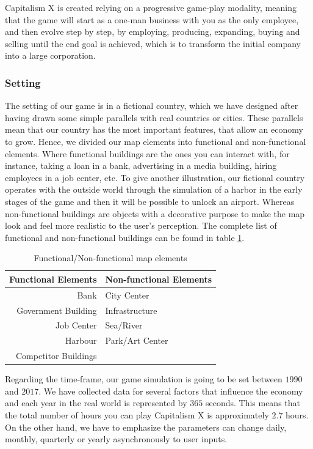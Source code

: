\documentclass[11pt,titlepage,oneside,openany]{book}
\begin{document}
Capitalism X is created relying on a progressive game-play modality, meaning that the game will start as a one-man business with you as the only employee, and then evolve step by step, by employing, producing, expanding, buying and selling until the end goal is achieved, which is to transform the initial company into a large corporation. 

\subsubsection{Setting}
The setting of our game is in a fictional country, which we have designed after having drawn some simple parallels with real countries or cities. These parallels mean that our country has the most important features, that allow an economy to grow. Hence, we divided our map elements into functional and non-functional elements. Where functional buildings are the ones you can interact with, for instance, taking a loan in a bank, advertising in a media building, hiring employees in a job center, etc.  To give another illustration, our fictional country operates with the outside world through the simulation of a harbor in the early stages of the game and then it will be possible to unlock an airport. Whereas non-functional buildings are objects with a decorative purpose to make the map look and feel  more realistic to the user’s perception. The complete list of functional and non-functional buildings can be found in table \ref{table:map-el}. 
\begin{table}[ht]
\centering
\begin{tabular}{r|l}
\hline 
 Functional Elements & Non-functional Elements\\
\hline \hline
 Bank & City Center  \\
 Government Building & Infrastructure \\
 Job Center & Sea/River \\
 Harbour & Park/Art Center  \\
 Competitor Buildings & \\
\hline
\end{tabular}
\caption{Functional/Non-functional map elements}
\label{table:map-el}
\end{table}


Regarding the time-frame, our game simulation is going to be set between $1990$ and $2017$. We have collected data for several factors that influence the economy and each year in the real world is represented by $365$ seconds. This means that the total number of hours you can play Capitalism X is approximately $2.7$ hours. 
On the other hand, we have to emphasize the parameters can change daily, monthly, quarterly or yearly  asynchronously to user inputs.
\end{document}
